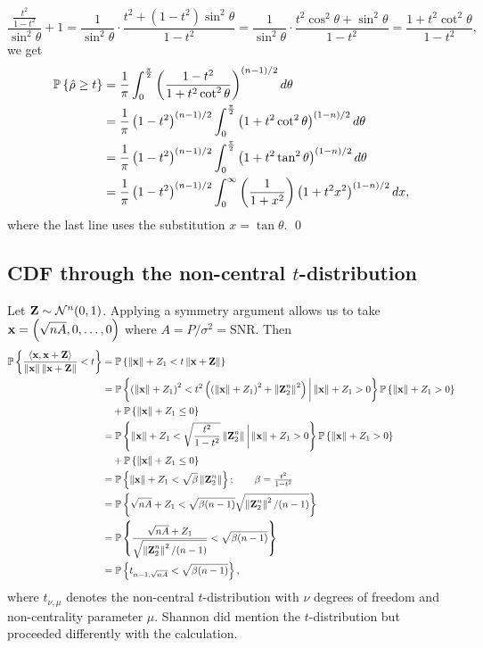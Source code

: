 \begin{equation*}
	\frac{ \frac{t^2}{1-t^2}  } {\sin^2 \theta} +1
	=\frac{1}{\sin^2 \theta} \cdot \frac{ t^2+(1-t^2)\sin^2 \theta }{1-t^2}
	=\frac{1}{\sin^2 \theta} \cdot \frac{ t^2\cos^2 \theta+\sin^2 \theta }{1-t^2}
	=\frac{1 + t^2\cot^2 \theta}{1-t^2},
\end{equation*}
we get
\begin{align*}
	\mathbb{P}\left\{ \hat\rho \geq t \right\}
	&=\frac{1}{\pi} \int_{0}^{\frac \pi 2} \left( \frac{1-t^2}{1+t^2\cot^2 \theta} \right)^{(n-1)/2} d \theta \\
	&=\frac{1}{\pi} \left( 1-t^2 \right)^{(n-1)/2} \int_{0}^{\frac \pi 2} \left( 1+t^2\cot^2 \theta \right)^{(1-n)/2} d \theta \\
	&=\frac{1}{\pi} \left( 1-t^2 \right)^{(n-1)/2} \int_{0}^{\frac \pi 2} \left( 1+t^2\tan^2 \theta \right)^{(1-n)/2} d \theta \\
	&=\frac{1}{\pi} \left( 1-t^2 \right)^{(n-1)/2} \int_{0}^{\infty}\left( 1\over 1+x^2  \right) \left( 1+t^2 x^2  \right)^{(1-n)/2} dx,
\end{align*}
where the last line uses the substitution $x = \tan\theta$.  \qed

\subsection{CDF through the non-central $t$-distribution}
\label{sec:awgn2-cdf}

Let $\textbf{Z} \sim \mathcal{N}^n(0,1)$.  Applying a symmetry argument allows us to take $\mathbf{x}=\left( \sqrt{nA}, 0, \dots, 0 \right)$ where $A = P/\sigma^2 = \mathrm{SNR}$.  Then
\begin{align*}
	\mathbb{P}\left\{ \frac{\langle \mathbf{x},\mathbf{x}+\textbf{Z} \rangle}{\left\Vert \mathbf{x} \right\Vert\left\Vert \mathbf{x}+\textbf{Z} \right\Vert} < t \right\}
	&= \mathbb{P}\left\{ \left\Vert \mathbf{x} \right\Vert+Z_1 < t\left\Vert \mathbf{x}+\textbf{Z} \right\Vert \right\} \\
	&= \mathbb{P}\left\{ \left( \left\Vert \mathbf{x} \right\Vert+Z_1 \right)^2 < t^2\left( \left( \left\Vert \mathbf{x} \right\Vert+Z_1 \right)^2+\left\Vert \textbf{Z}_2^n \right\Vert^2 \right)\bigg|\left\Vert \mathbf{x} \right\Vert+Z_1 > 0 \right\}\mathbb{P}\left\{ \left\Vert \mathbf{x} \right\Vert+Z_1 > 0 \right\} \\
	&\quad + \mathbb{P}\left\{ \left\Vert \mathbf{x} \right\Vert+Z_1 \leq 0 \right\} \\
	&= \mathbb{P}\left\{ \left\Vert \mathbf{x} \right\Vert+Z_1 < \sqrt{\frac{t^2}{1-t^2}}\left\Vert \textbf{Z}_2^n \right\Vert\bigg|\left\Vert \mathbf{x} \right\Vert+Z_1 > 0 \right\}\mathbb{P}\left\{ \left\Vert \mathbf{x} \right\Vert+Z_1 > 0 \right\} \\
	&\quad + \mathbb{P}\left\{ \left\Vert \mathbf{x} \right\Vert+Z_1 \leq 0 \right\} \\
	&= \mathbb{P}\left\{ \left\Vert \mathbf{x} \right\Vert+Z_1 < \sqrt{\beta}\left\Vert \textbf{Z}_2^n \right\Vert \right\} ; \qquad \beta=\tfrac{t^2}{1-t^2} \\
	&= \mathbb{P}\left\{ \sqrt{nA}+Z_1 < \sqrt{\beta(n-1)}\sqrt{\left\Vert \textbf{Z}_2^n \right\Vert^2/(n-1)} \right\} \\
	&= \mathbb{P}\left\{ \frac{\sqrt{nA}+Z_1}{\sqrt{\left\Vert \textbf{Z}_2^n \right\Vert^2 / (n-1)}} < \sqrt{\beta(n-1)} \right\} \\
	&= \mathbb{P}\left\{ t_{n-1, \sqrt{nA}} < \sqrt{\beta(n-1)} \right\},
\end{align*}
where $t_{\nu, \mu}$ denotes the non-central $t$-distribution with $\nu$ degrees of freedom and non-centrality parameter $\mu$.  Shannon \cite{shannon1959probability} did mention the $t$-distribution but proceeded differently with the calculation.

